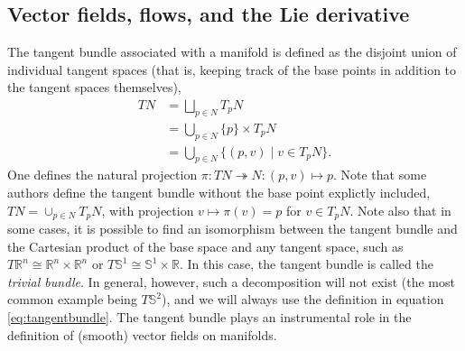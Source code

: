 \documentclass[psamsfonts]{amsart}
\theoremstyle{definition}
\theoremstyle{remark}
\newcommand*\R{\mathds{R}}
\numberwithin{equation}{section}
\begin{document}
\subsection{Vector fields, flows, and the Lie derivative}
The tangent bundle associated with a manifold is defined as the disjoint union of individual tangent spaces (that is, keeping track of the base points in addition to the tangent spaces themselves), 
\begin{equation}\label{eq:tangentbundle}
\begin{aligned}
TN & = {} \bigsqcup_{p \in N} T_pN\\
 & = {} \bigcup_{p \in N} \{p\} \times T_pN\\
 & = {} \bigcup_{p \in N} \{(p, v) \mid v \in T_pN\}.
\end{aligned}
\end{equation}
One defines the natural projection $\pi : TN \twoheadrightarrow N : (p, v) \mapsto p$. %
Note that some authors define the tangent bundle without the base point explictly included, $TN = \cup_{p\in N}T_pN$, with projection $v \mapsto \pi(v) = p$ for $v \in T_pN$. Note also that in some cases, it is possible to find an isomorphism between the tangent bundle and the Cartesian product of the base space and any tangent space, such as $T\R^n \cong \R^n \times \R^n$ or $T\mathbb{S}^1 \cong \mathbb{S}^1 \times \R$. In this case, the tangent bundle is called the \textit{trivial bundle}. In general, however, such a decomposition will not exist (the most common example being $T\mathbb{S}^2$), and we will always use the definition in equation \ref{eq:tangentbundle}. The tangent bundle plays an instrumental role in the definition of (smooth) vector fields on manifolds. 

\end{document}
